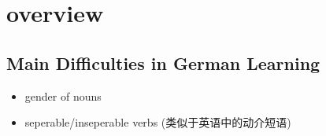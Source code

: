 \chapter*{overview}
\section{Main Difficulties in German Learning}
\begin{itemize}
    \item gender of nouns
    \item seperable/inseperable verbs (类似于英语中的动介短语)
\end{itemize}
